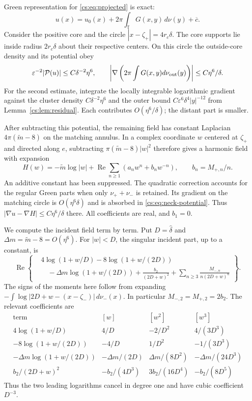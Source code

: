 \documentclass[11pt,reqno]{amsart}
\numberwithin{equation}{section}
\theoremstyle{definition}
\theoremstyle{remark}
\newcommand{\T}{\mathbb T}
\newcommand{\eps}{\varepsilon}
\begin{document}
Green representation for \eqref{cs:eq:projected} is exact:
\begin{equation}\label{cs:eq:representation}
 u(x)=u_0(x)+2\pi\int_\T G(x,y)\,d\nu(y)+\overline c .
\end{equation}
Consider the positive core and the circle
$|x-\zeta_+|=4r_c\delta$. The core supports lie inside radius
$2r_c\delta$ about their respective centers.
On this circle the outside-core density and its potential obey
\begin{equation}\label{cs:eq:neck-potential}
 \eps^{-2}|\mathcal P(u)|\le C\delta^{-2}\eta^6,\qquad
 \left|\nabla\left(2\pi\int G(x,y)d\nu_{\rm out}(y)\right)\right|
                         \le C\eta^6/\delta.
\end{equation}
For the second estimate, integrate the locally integrable logarithmic
gradient against the cluster density $C\delta^{-2}\eta^6$ and the outer
bound $C\eps^6\delta^4|y|^{-12}$ from Lemma~\ref{cs:lem:residual}.
Each contributes $O(\eta^6/\delta)$; the distant part is smaller.

After subtracting this potential, the remaining field has constant
Laplacian $4\pi(\widetilde m-8)$ on the matching annulus.
In a complex coordinate $w$ centered at $\zeta_+$ and directed along
$e$, subtracting $\pi(\widetilde m-8)|w|^2$ therefore gives a harmonic
field with expansion
\begin{equation}\label{cs:eq:Laurent}
 H(w)=-\widetilde m\log|w|
             +\operatorname{Re}\sum_{n\ge1}(a_nw^n+b_nw^{-n}),
 \qquad b_n=M_{+,n}/n .
\end{equation}
An additive constant has been suppressed.
The quadratic correction accounts for the regular Green parts when
only $\nu_++\nu_-$ is retained. Its gradient on the matching circle is
$O(\eta^6\delta)$ and is absorbed in \eqref{cs:eq:neck-potential}.
Thus $|\nabla u-\nabla H|\le C\eta^6/\delta$ there.
All coefficients are real, and $b_1=0$.

We compute the incident field term by term. Put
$D=\widehat\delta$ and $\Delta m=\widetilde m-8=O(\eta^6)$.
For $|w|<D$, the singular incident part, up to a constant, is
\[
 \operatorname{Re}\left\{\begin{aligned}
 &4\log(1+w/D)-8\log(1+w/(2D))\\
 &\quad-\Delta m\log(1+w/(2D))+\frac{b_2}{(2D+w)^2}
       +\sum_{n\ge3}\frac{M_{-,n}}{n(2D+w)^n}
 \end{aligned}\right\}.
\]
The signs of the moments here follow from expanding
$-\int\log|2D+w-(x-\zeta_-)|\,d\nu_-(x)$.
In particular $M_{-,2}=M_{+,2}=2b_2$. The relevant coefficients are
\[
\begin{array}{c|ccc}
 \text{term} & [w] & [w^2] & [w^3]\\ \hline
 4\log(1+w/D) & 4/D & -2/D^2 & 4/(3D^3)\\
 -8\log(1+w/(2D)) & -4/D & 1/D^2 & -1/(3D^3)\\
 -\Delta m\log(1+w/(2D))
      & -\Delta m/(2D)&\Delta m/(8D^2)&-\Delta m/(24D^3)\\
 b_2/(2D+w)^2 &-b_2/(4D^3)&3b_2/(16D^4)&-b_2/(8D^5)
\end{array}
\]
Thus the two leading logarithms cancel in degree one and have
cubic coefficient $D^{-3}$.
\end{document}
